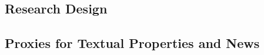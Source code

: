 \documentclass[letterpaper,11pt]{article}
\begin{document}
\begin{spacing}{1.5}
\begin{comment}
Aligned with the prior literature on the usefulness of conservatism, we argue that more complete, news-consistent and timely disclosure of bad news relative to good news enhances contract efficiency [specific hypotheses to be developed]. However, we do not make claims about the valuation role of narrative conservatism.

\end{comment}

\section{Research Design}
\subsection{Proxies for Textual Properties and News} \label{sec3.1}

\end{spacing}
\end{document}
